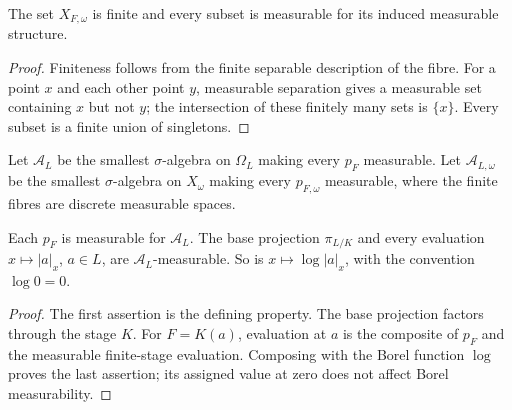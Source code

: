 \begin{lemma}\label{lem:finite-stage-discrete}
\leanok
{}
The set $X_{F,\omega}$ is finite and every subset is measurable for its
induced measurable structure.
\end{lemma}
\begin{proof}
Finiteness follows from the finite separable description of the fibre.
For a point $x$ and each other point $y$, measurable separation gives a
measurable set containing $x$ but not $y$; the intersection of these
finitely many sets is $\{x\}$. Every subset is a finite union of singletons.
\end{proof}

\begin{definition}\label{def:projective-measurable}
\leanok
{}
Let $\mathcal A_L$ be the smallest $\sigma$-algebra on $\Omega_L$ making
every $p_F$ measurable. Let $\mathcal A_{L,\omega}$ be the smallest
$\sigma$-algebra on $X_\omega$ making every $p_{F,\omega}$ measurable,
where the finite fibres are discrete measurable spaces.
\end{definition}

\begin{lemma}\label{lem:projective-evaluations}
\leanok
{}
Each $p_F$ is measurable for $\mathcal A_L$. The base projection
$\pi_{L/K}$ and every evaluation $x\mapsto |a|_x$, $a\in L$, are
$\mathcal A_L$-measurable. So is $x\mapsto\log|a|_x$, with the convention
$\log0=0$.
\end{lemma}
\begin{proof}
The first assertion is the defining property. The base projection factors
through the stage $K$. For $F=K(a)$, evaluation at $a$ is the composite
of $p_F$ and the measurable finite-stage evaluation. Composing with the
Borel function $\log$ proves the last assertion; its assigned value at
zero does not affect Borel measurability.
\end{proof}

